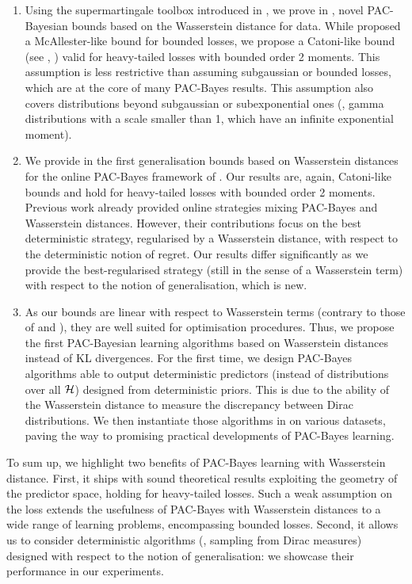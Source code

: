 \begin{enumerate}[label={\it (\roman*)}]
    \item Using the supermartingale toolbox introduced in , we prove in , novel PAC-Bayesian bounds based on the Wasserstein distance for \iid data.
    While \cite{amit2022integral} proposed a McAllester-like bound for bounded losses, we propose a Catoni-like bound (see \eg, \citealp[Theorem 4.1]{alquier2016properties}) valid for heavy-tailed losses with bounded order 2 moments.
    This assumption is less restrictive than assuming subgaussian or bounded losses, which are at the core of many PAC-Bayes results.
    This assumption also covers distributions beyond subgaussian or subexponential ones (\eg, gamma distributions with a scale smaller than 1, which have an infinite exponential moment). 
    \item We provide in  the first generalisation bounds based on Wasserstein distances for the online PAC-Bayes framework of .
    Our results are, again, Catoni-like bounds and hold for heavy-tailed losses with bounded order 2 moments.
    Previous work \citep{chee2021learning} already provided online strategies mixing PAC-Bayes and Wasserstein distances.
    However, their contributions focus on the best deterministic strategy, regularised by a Wasserstein distance, with respect to the deterministic notion of regret.
    Our results differ significantly as we provide the best-regularised strategy (still in the sense of a Wasserstein term) with respect to the notion of generalisation, which is new.
    \item As our bounds are linear with respect to Wasserstein terms (contrary to those of \citealp{amit2022integral} and ), they are well suited for optimisation procedures.
    Thus, we propose the first PAC-Bayesian learning algorithms based on Wasserstein distances instead of KL divergences.
    For the first time, we design PAC-Bayes algorithms able to output deterministic predictors (instead of distributions over all $\mathcal{H}$) designed from deterministic priors.
    This is due to the ability of the Wasserstein distance to measure the discrepancy between Dirac distributions.     
    We then instantiate those algorithms in  on various datasets, paving the way to promising practical developments of PAC-Bayes learning. 
\end{enumerate}

To sum up, we highlight two benefits of PAC-Bayes learning with Wasserstein distance.
First, it ships with sound theoretical results exploiting the geometry of the predictor space, holding for heavy-tailed losses.
Such a weak assumption on the loss extends the usefulness of PAC-Bayes with Wasserstein distances to a wide range of learning problems, encompassing bounded losses.
Second, it allows us to consider deterministic algorithms (\ie, sampling from Dirac measures) designed with respect to the notion of generalisation: we showcase their performance in our experiments.

